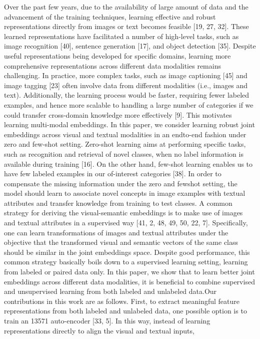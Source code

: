 \documentclass[10pt,twocolumn,letterpaper]{article}
\begin{document}
Over the past few years, due to the availability of large
amount of data and the advancement of the training techniques, learning effective and robust representations directly from images or text becomes feasible [19, 27, 32].
These learned representations have facilitated a number of
high-level tasks, such as image recognition [40], sentence
generation [17], and object detection [35]. Despite useful representations being developed for specific domains,
learning more comprehensive representations across different data modalities remains challenging. In practice,
more complex tasks, such as image captioning [45] and image tagging [23] often involve data from different modalities (i.e., images and text). Additionally, the learning process would be faster, requiring fewer labeled examples, and
hence more scalable to handling a large number of categories if we could transfer cross-domain knowledge more
effectively [9]. This motivates learning multi-modal embeddings. In this paper, we consider learning robust joint
embeddings across visual and textual modalities in an endto-end fashion under zero and few-shot setting.
Zero-shot learning aims at performing specific tasks,
such as recognition and retrieval of novel classes, when no
label information is available during training [16]. On the
other hand, few-shot learning enables us to have few labeled
examples in our of-interest categories [38]. In order to compensate the missing information under the zero and fewshot setting, the model should learn to associate novel concepts in image examples with textual attributes and transfer
knowledge from training to test classes. A common strategy for deriving the visual-semantic embeddings is to make
use of images and textual attributes in a supervised way
[41, 2, 48, 49, 50, 22, 7]. Specifically, one can learn transformations of images and textual attributes under the objective that the transformed visual and semantic vectors of the
same class should be similar in the joint embeddings space.
Despite good performance, this common strategy basically
boils down to a supervised learning setting, learning from
labeled or paired data only. In this paper, we show that to
learn better joint embeddings across different data modalities, it is beneficial to combine supervised and unsupervised
learning from both labeled and unlabeled data.Our contributions in this work are as follows. First,
to extract meaningful feature representations from both labeled and unlabeled data, one possible option is to train an
13571
auto-encoder [33, 5]. In this way, instead of learning representations directly to align the visual and textual inputs,
\end{document}
